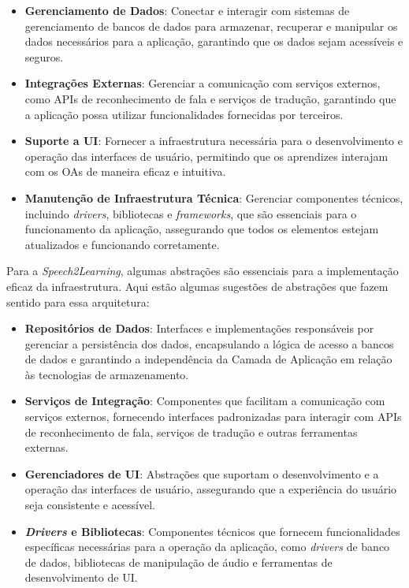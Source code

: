 \begin{itemize}
    \item \textbf{Gerenciamento de Dados}: Conectar e interagir com sistemas de gerenciamento de bancos de dados para armazenar, recuperar e manipular os dados necessários para a aplicação, garantindo que os dados sejam acessíveis e seguros.

    \item \textbf{Integrações Externas}: Gerenciar a comunicação com serviços externos, como APIs de reconhecimento de fala e serviços de tradução, garantindo que a aplicação possa utilizar funcionalidades fornecidas por terceiros.

    \item \textbf{Suporte a UI}: Fornecer a infraestrutura necessária para o desenvolvimento e operação das interfaces de usuário, permitindo que os aprendizes interajam com os OAs de maneira eficaz e intuitiva.

    \item \textbf{Manutenção de Infraestrutura Técnica}: Gerenciar componentes técnicos, incluindo \textit{drivers}, bibliotecas e \textit{frameworks}, que são essenciais para o funcionamento da aplicação, assegurando que todos os elementos estejam atualizados e funcionando corretamente.
\end{itemize}

Para a \textit{Speech2Learning}, algumas abstrações são essenciais para a implementação eficaz da infraestrutura. Aqui estão algumas sugestões de abstrações que fazem sentido para essa arquitetura:

\begin{itemize}
    \item \textbf{Repositórios de Dados}: Interfaces e implementações responsáveis por gerenciar a persistência dos dados, encapsulando a lógica de acesso a bancos de dados e garantindo a independência da Camada de Aplicação em relação às tecnologias de armazenamento.

    \item \textbf{Serviços de Integração}: Componentes que facilitam a comunicação com serviços externos, fornecendo interfaces padronizadas para interagir com APIs de reconhecimento de fala, serviços de tradução e outras ferramentas externas.

    \item \textbf{Gerenciadores de UI}: Abstrações que suportam o desenvolvimento e a operação das interfaces de usuário, assegurando que a experiência do usuário seja consistente e acessível.

    \item \textbf{\textit{Drivers} e Bibliotecas}: Componentes técnicos que fornecem funcionalidades específicas necessárias para a operação da aplicação, como \textit{drivers} de banco de dados, bibliotecas de manipulação de áudio e ferramentas de desenvolvimento de UI.
\end{itemize}

